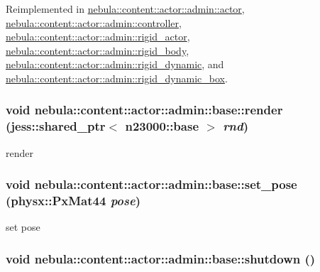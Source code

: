 Reimplemented in \hyperlink{classnebula_1_1content_1_1actor_1_1admin_1_1actor_a1fa2018d91941548c260422e1b867ba5}{nebula::content::actor::admin::actor}, \hyperlink{classnebula_1_1content_1_1actor_1_1admin_1_1controller_a4353c8b538a9a5334152f3b3eab5034d}{nebula::content::actor::admin::controller}, \hyperlink{classnebula_1_1content_1_1actor_1_1admin_1_1rigid__actor_a633100102ba359becd477f46159270de}{nebula::content::actor::admin::rigid\_\-actor}, \hyperlink{classnebula_1_1content_1_1actor_1_1admin_1_1rigid__body_a7ed8ba2a35fdf83cf508fe37fde0d875}{nebula::content::actor::admin::rigid\_\-body}, \hyperlink{classnebula_1_1content_1_1actor_1_1admin_1_1rigid__dynamic_accf38f3f07acdbe924c46388230d2e99}{nebula::content::actor::admin::rigid\_\-dynamic}, and \hyperlink{classnebula_1_1content_1_1actor_1_1admin_1_1rigid__dynamic__box_aeed451b7d00e75948f474e4bb20404ba}{nebula::content::actor::admin::rigid\_\-dynamic\_\-box}.\hypertarget{classnebula_1_1content_1_1actor_1_1admin_1_1base_a1b6e0f848261fe63df0ff8968467bbe8}{
\subsubsection[{render}]{\setlength{\rightskip}{0pt plus 5cm}void nebula::content::actor::admin::base::render (jess::shared\_\-ptr$<$ {\bf n23000::base} $>$ {\em rnd})}}
\label{classnebula_1_1content_1_1actor_1_1admin_1_1base_a1b6e0f848261fe63df0ff8968467bbe8}


render \hypertarget{classnebula_1_1content_1_1actor_1_1admin_1_1base_a3111488a28385477fea9ef1a348da929}{
\subsubsection[{set\_\-pose}]{\setlength{\rightskip}{0pt plus 5cm}void nebula::content::actor::admin::base::set\_\-pose (physx::PxMat44 {\em pose})}}
\label{classnebula_1_1content_1_1actor_1_1admin_1_1base_a3111488a28385477fea9ef1a348da929}


set pose \hypertarget{classnebula_1_1content_1_1actor_1_1admin_1_1base_a5f8943404407602a6757d3ab448d4a75}{
\subsubsection[{shutdown}]{\setlength{\rightskip}{0pt plus 5cm}void nebula::content::actor::admin::base::shutdown ()}}
\label{classnebula_1_1content_1_1actor_1_1admin_1_1base_a5f8943404407602a6757d3ab448d4a75}


